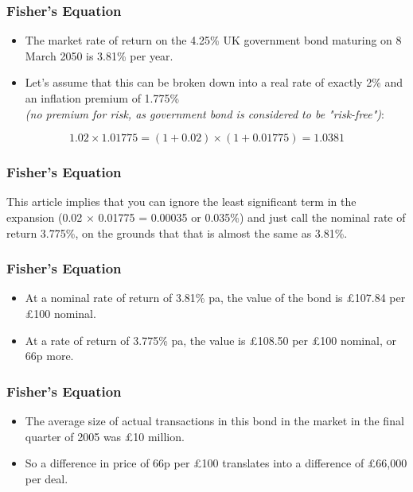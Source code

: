 \documentclass{beamer}
\begin{document}
\begin{frame}
\frametitle{Fisher's Equation}
\Large
\begin{itemize}
\item The market rate of return on the 4.25\% UK government bond maturing on 8 March 2050 is 3.81\% per year. \item Let's assume that this can be broken down into a real rate of exactly 2\% and an inflation premium of 1.775\% \\ \textit{(no premium for risk, as government bond is considered to be "risk-free")}:
\end{itemize}
\[ 1.02 \times 1.01775 = (1 + 0.02) \times (1 + 0.01775) = 1.0381 \]

\end{frame}
	\begin{frame}
		\frametitle{Fisher's Equation}
This article implies that you can ignore the least significant term in the expansion (0.02 × 0.01775 = 0.00035 or 0.035\%) and just call the nominal rate of return 3.775\%, on the grounds that that is almost the same as 3.81\%.
\end{frame}

\begin{frame}
\frametitle{Fisher's Equation}
\Large
\begin{itemize}
\item At a nominal rate of return of 3.81\% pa, the value of the bond is £107.84 per £100 nominal. 
\item At a rate of return of 3.775\% pa, the value is £108.50 per £100 nominal, or 66p more.
\end{itemize}
\end{frame}

\begin{frame}
	\frametitle{Fisher's Equation}
	\Large
\begin{itemize}
	\item
The average size of actual transactions in this bond in the market in the final quarter of 2005 was £10 million. 
\item So a difference in price of 66p per £100 translates into a difference of £66,000 per deal.
\end{itemize}
\end{frame}
\end{document}
